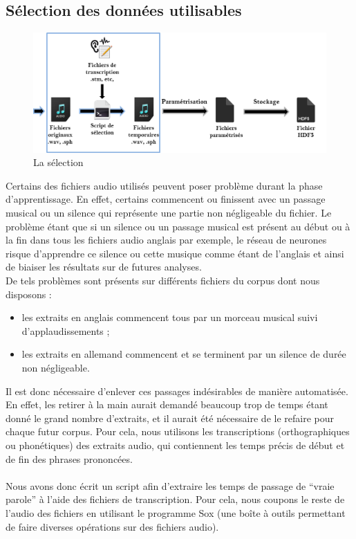 \documentclass{article}
\begin{document}
\subsection{Sélection des données utilisables}

\newpage

\hphantom{.}
\begin{figure}[h]
  \centerline{\includegraphics[scale=0.8]{img/schema_selection.png}}
  \caption{La sélection}
\end{figure}

Certains des fichiers audio utilisés peuvent poser problème durant la phase d'apprentissage. En effet, certains commencent ou finissent avec un passage musical ou un silence qui représente une partie non négligeable du fichier. Le problème étant que si un silence ou un passage musical est présent au début ou à la fin dans tous les fichiers audio anglais par exemple, le réseau de neurones risque d'apprendre ce silence ou cette musique comme étant de l'anglais et ainsi de biaiser les résultats sur de futures analyses.\\
\noindent De tels problèmes sont présents sur différents fichiers du corpus dont nous disposons :
\begin{itemize}
    \item les extraits en anglais commencent tous par un morceau musical suivi d'applaudissements ;

    \item les extraits en allemand commencent et se terminent par un silence de durée non négligeable.
    \end{itemize}
    
\noindent Il est donc nécessaire d'enlever ces passages indésirables de manière automatisée. En effet, les retirer à la main aurait demandé beaucoup trop de temps étant donné le grand nombre d'extraits, et il aurait été nécessaire de le refaire pour chaque futur corpus. Pour cela, nous utilisons les transcriptions (orthographiques ou phonétiques) des extraits audio, qui contiennent les temps précis de début et de fin des phrases prononcées.\\
 \\
 Nous avons donc écrit un script afin d'extraire les temps de passage de ``vraie parole'' à l'aide des fichiers de transcription. Pour cela, nous coupons le reste de l'audio des fichiers en utilisant le programme Sox\cite{docSox} (une boîte à outils permettant de faire diverses opérations sur des fichiers audio).
\end{document}

